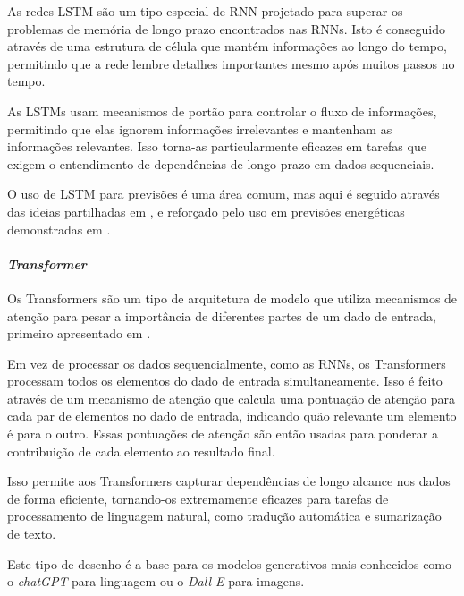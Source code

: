 As redes \gls{LSTM} são um tipo especial de RNN projetado para superar os problemas de memória de longo prazo encontrados nas RNNs. Isto é conseguido através de uma estrutura de célula que mantém informações ao longo do tempo, permitindo que a rede lembre detalhes importantes mesmo após muitos passos no tempo.\par
As \gls{LSTM}s usam mecanismos de portão para controlar o fluxo de informações, permitindo que elas ignorem informações irrelevantes e mantenham as informações relevantes. Isso torna-as particularmente eficazes em tarefas que exigem o entendimento de dependências de longo prazo em dados sequenciais.\par


O uso de \gls{LSTM} para previsões é uma área comum, mas aqui é seguido através das ideias partilhadas em \cite{Hewamalage2021}, e reforçado pelo uso em previsões energéticas demonstradas em \cite{Costa2022}.\par


\paragraph{\textit{Transformer}\label{se:transformer_sec}}
\text{ }  \par

Os Transformers são um tipo de arquitetura de modelo que utiliza mecanismos de atenção para pesar a importância de diferentes partes de um dado de entrada, primeiro apresentado em \cite{Vaswani2017}.\par
Em vez de processar os dados sequencialmente, como as RNNs, os Transformers processam todos os elementos do dado de entrada simultaneamente. Isso é feito através de um mecanismo de atenção que calcula uma pontuação de atenção para cada par de elementos no dado de entrada, indicando quão relevante um elemento é para o outro. Essas pontuações de atenção são então usadas para ponderar a contribuição de cada elemento ao resultado final.\par
Isso permite aos Transformers capturar dependências de longo alcance nos dados de forma eficiente, tornando-os extremamente eficazes para tarefas de processamento de linguagem natural, como tradução automática e sumarização de texto.\par
Este tipo de desenho é a base para os modelos generativos mais conhecidos como o \textit{chatGPT} para linguagem ou o \textit{Dall-E} para imagens.\par



